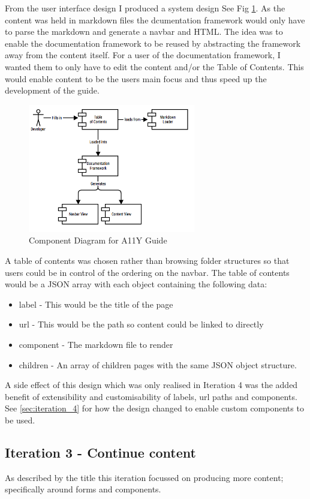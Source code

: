 From the user interface design I produced a system design See Fig
\ref{fig:allycomponent}. As the content was held in markdown files the
dcumentation framework would only have to parse the markdown and generate a
navbar and HTML. The idea was to enable the documentation framework
to be reused by abstracting the framework away from the content itself. For a
user of the documentation framework, I wanted them to only have to edit the
content and/or the Table of Contents. This would enable content to be the
users main focus and thus speed up the development of the guide.
\begin{figure}[H]
\centering
\includegraphics[width=0.65\textwidth]{figures/documentation_design}
\captionsetup{justification=centering}
\caption[Short figure name.]{Component Diagram for A11Y Guide
\label{fig:allycomponent}}
\end{figure}
A table of contents was
chosen rather than browsing folder structures so that users
could be in control of the ordering on the navbar. The table of contents
would be a JSON array with each object containing the following data:
\begin{itemize}
\item label - This would be the title of the page
\item url - This would be the path so content could be linked to directly
\item component - The markdown file to render
\item children - An array of children pages with the same JSON object structure.
\end{itemize}
A side effect of this design which was only realised in Iteration 4 was the
added benefit of extensibility and customisability of labels, url paths and
components. See \ref{sec:iteration_4} for how the design changed to enable
custom components to be used.

\subsection{Iteration 3 - Continue content}
As described by the title this iteration focussed on producing more content;
specifically around forms and components.

